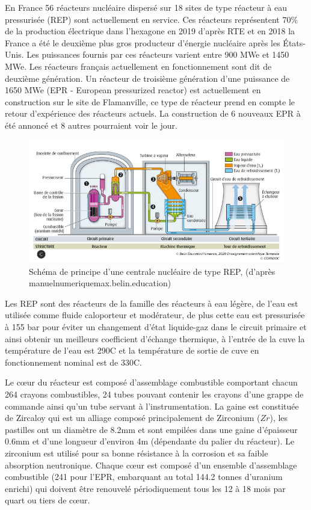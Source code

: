 \documentclass[a4paper,11pt,fleqn]{report}    %
\begin{document}
En France 56 réacteurs nucléaire dispersé sur 18 sites de type réacteur à eau pressurisée (REP) sont actuellement en service. Ces réacteurs représentent 70\% de la production électrique dans l'hexagone en 2019 d'après RTE et en 2018 la France a été le deuxième plus gros producteur d'énergie nucléaire après les États-Unis. Les puissances fournis par ces réacteurs varient entre 900 MWe et 1450 MWe. Les réacteurs français actuellement en fonctionnement sont dit de deuxième génération. Un réacteur de troisième génération d'une puissance de 1650 MWe (EPR - European pressurized reactor) est actuellement en construction sur le site de Flamanville, ce type de réacteur prend en compte le retour d'expérience des réacteurs actuels. La construction de 6 nouveaux EPR à été annoncé et 8 autres pourraient voir le jour. \\

\begin{figure}[h!]
	\centering
	\includegraphics[width=0.8\linewidth]{figure/sch_centrale1}
	\caption[Schéma de principe d'une centrale nucléaire de type REP]{Schéma de principe d'une centrale nucléaire de type REP, (d'après manuelnumeriquemax.belin.education)}
	\label{fig:schcentrale1}
\end{figure} 
Les REP sont des réacteurs de la famille des réacteurs à eau légère, de l'eau est utilisée comme fluide caloporteur et modérateur, de plus cette eau est pressurisée à 155 bar pour éviter un changement d'état liquide-gaz dans le circuit primaire et ainsi obtenir un meilleurs coefficient d'échange thermique, à l'entrée de la cuve la température de l'eau est 290\textdegree C et la température de sortie de cuve en fonctionnement nominal est de 330\textdegree C.

Le c\oe ur du réacteur est composé d'assemblage combustible comportant chacun 264 crayons combustibles, 24 tubes pouvant contenir les crayons d'une grappe de commande ainsi qu'un tube servant à l'instrumentation. La gaine est constituée de Zircaloy qui est un alliage composé principalement de Zirconium ($Zr$), les pastilles ont un diamètre de 8.2mm et sont empilées dans une gaine d'épaisseur 0.6mm et d'une longueur d'environ 4m (dépendante du palier du réacteur). Le zirconium est utilisé pour sa bonne résistance à la corrosion et sa faible absorption neutronique. Chaque c\oe ur est composé d'un ensemble d'assemblage combustible (241 pour l'EPR, embarquant au total 144.2 tonnes d'uranium enrichi) qui doivent être renouvelé périodiquement tous les 12 à 18 mois par quart ou tiers de c\oe ur.
\end{document}
